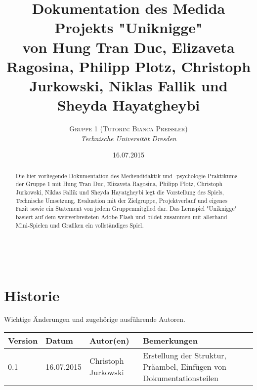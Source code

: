\documentclass[a4paper, 11pt]{article} %
\title{\textbf{Dokumentation des Medida Projekts "Uniknigge"}\\ %
von Hung Tran Duc, Elizaveta Ragosina, Philipp Plotz, Christoph Jurkowski, Niklas Fallik und Sheyda Hayatgheybi} %
\author{\textsc{Gruppe 1 (Tutorin: Bianca Preißler)} %
\\{\textit{Technische Universität Dresden}}} %
\date{16.07.2015} %
\makeatletter
\renewcommand{\maketitle}{ %
\begin{flushright} %
{\LARGE\@title} %

\vspace{50pt} %

{\large\@author} %
\\\@date %

\vspace{40pt} %
\end{flushright}
}
\makeatother
\begin{document}
\maketitle %


\renewcommand{\abstractname}{Präambel} %

\vspace{5cm} %


\begin{abstract}
\noindent
Die hier vorliegende Dokumentation des Mediendidaktik und -psychologie Praktikums der Gruppe 1 mit Hung Tran Duc, Elizaveta Ragosina, Philipp Plotz, Christoph Jurkowski, Niklas Fallik und Sheyda Hayatgheybi legt die Vorstellung des Spiels, Technische Umsetzung, Evaluation mit der Zielgruppe, Projektverlauf
und eigenes Fazit sowie ein Statement von jedem Gruppenmitglied dar. Das Lernspiel "Uniknigge" basiert auf dem weitverbreiteten Adobe Flash und bildet zusammen mit allerhand Mini-Spielen und Grafiken ein vollständiges Spiel.
\end{abstract}


\newpage 
\section*{Historie}
Wichtige Änderungen und zugehörige ausführende Autoren.\\
\begin{tabular}{|lllp{5.5cm}|}
\hline 
\textbf{Version} & \textbf{Datum} & \textbf{Autor(en)} & \textbf{Bemerkungen} \\ 
\hline 
0.1 & 16.07.2015 & Christoph Jurkowski & \nohyphens{Erstellung der Struktur, Präambel, Einfügen von Dokumentationsteilen} \\ 
\hline
\end{tabular} 


\end{document}
